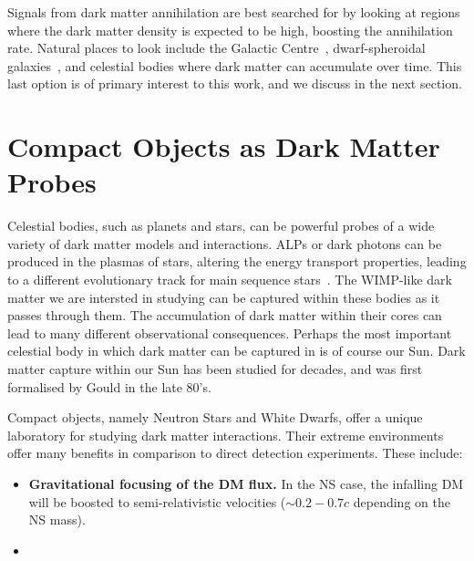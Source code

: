 Signals from dark matter annihilation are best searched for by looking at regions where the dark matter density is expected to be high, boosting the annihilation rate. 
Natural places to look include the Galactic Centre~\cite{Ipek:2014gua_sep_RenormalizableModelGalactic,Fermi-LAT:2017opo_may_FermiGalacticCenter}, dwarf-spheroidal galaxies~\cite{Bonnivard:2015xpq_oct_Darkmatterannihilation}, and celestial bodies where dark matter can accumulate over time.
This last option is of primary interest to this work, and we discuss in the next section.



\section{Compact Objects as Dark Matter Probes}

Celestial bodies, such as planets and stars, can be powerful probes of a wide variety of dark matter models and interactions.
ALPs or dark photons can be produced in the plasmas of stars, altering the energy transport properties, leading to a different evolutionary track for main sequence stars~\cite*{FRED}.
The WIMP-like dark matter we are intersted in studying can be captured within these bodies as it passes through them.
The accumulation of dark matter within their cores can lead to many different observational consequences.
Perhaps the most important celestial body in which dark matter can be captured in is of course our Sun.
Dark matter capture within our Sun has been studied for decades, and was first formalised by Gould in the late 80's.



Compact objects, namely Neutron Stars and White Dwarfs, offer a unique
laboratory for studying dark matter interactions. Their extreme environments
offer many benefits in comparison to direct detection experiments. 
These include:

\begin{itemize}
\item \textbf{Gravitational focusing of the DM flux.} In the NS case, the 
infalling DM will be boosted to semi-relativistic velocities ($\sim 0.2 - 0.7 c$
depending on the NS mass).
\item 
\end{itemize}


